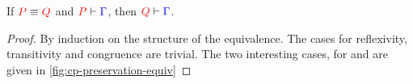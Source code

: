 \begin{lemma}\label{thm:cp-preservation-equiv}
  If $\tm{P} \equiv \tm{Q}$ and $\seq[{ P }]{ \Gamma }$, then $\seq[{ Q }]{ \Gamma }$.
\end{lemma}
\begin{proof}
  By induction on the structure of the equivalence. The cases for reflexivity,
  transitivity and congruence are trivial. The two interesting cases, for
  \cpEquivCutComm and  are given in \cref{fig:cp-preservation-equiv}
\end{proof}
